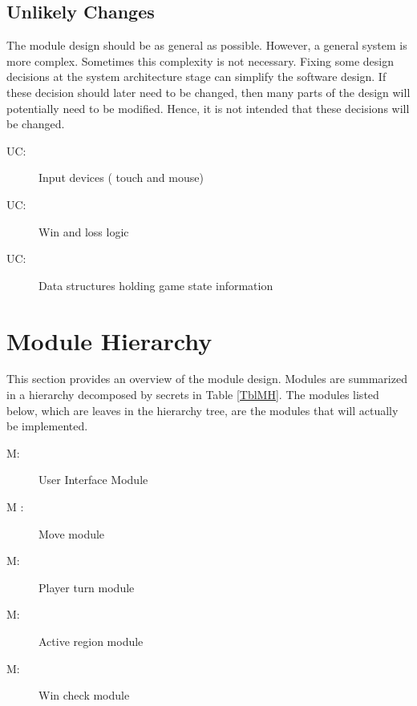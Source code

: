 \documentclass[12pt, titlepage]{article}
\newcounter{ucnum}
\newcommand{\uctheucnum}{UC\theucnum}
\newcounter{mnum}
\newcommand{\mthemnum}{M\themnum}
\begin{document}
\subsection{Unlikely Changes} \label{SecUchange}

The module design should be as general as possible. However, a general system is
more complex. Sometimes this complexity is not necessary. Fixing some design
decisions at the system architecture stage can simplify the software design. If
these decision should later need to be changed, then many parts of the design
will potentially need to be modified. Hence, it is not intended that these
decisions will be changed.

\begin{description}
\item[ \uctheucnum \label{uc1}:] Input devices ( touch and mouse)
\item[ \uctheucnum \label{uc2}:] Win and loss logic
\item[ \uctheucnum \label{uc3}:] Data structures holding game state information
\end{description}

\section{Module Hierarchy} \label{SecMH}

This section provides an overview of the module design. Modules are summarized
in a hierarchy decomposed by secrets in Table \ref{TblMH}. The modules listed
below, which are leaves in the hierarchy tree, are the modules that will
actually be implemented.

\begin{description}
\item [ \mthemnum \label{m1}:] User Interface Module
\item [ \mthemnum \label{m2} :] Move module
\item [ \mthemnum \label{m3}:] Player turn module
\item [ \mthemnum \label{m4}:] Active region module
\item [ \mthemnum \label{m5}:] Win check module
\end{description}
\end{document}
